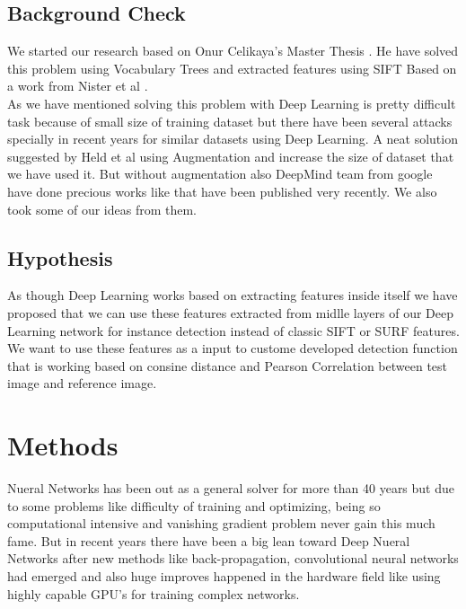 \documentclass[10pt,twocolumn,letterpaper]{article}
\begin{document}
\subsection{Background Check}
We started our research based on Onur Celikaya's Master Thesis \cite{Onur_Calikus_YLT}. He have solved this problem using Vocabulary Trees and extracted features using SIFT \cite{SIFT} Based on a work from Nister et al \cite{vocabulary_tree}. \\
As we have mentioned solving this problem with Deep Learning is pretty difficult task because of small size of training dataset but there have been several attacks specially in recent years for similar datasets using Deep Learning. A neat solution suggested by Held et al \cite{augmented_deep} using Augmentation and increase the size of dataset that we have used it. But without augmentation also DeepMind team from google have done precious works like \cite{oneshotlearning1}\cite{oneshotlearning2}\cite{oneshotlearning3} that have been published very recently. We also took some of our ideas from them.


\subsection{Hypothesis}
As though Deep Learning works based on extracting features inside itself we have proposed that we can use these features extracted from midlle layers of our Deep Learning network for instance detection instead of classic SIFT or SURF features. We want to use these features as a input to custome developed detection function that is working based on consine distance and Pearson Correlation between test image and reference image.


\section{Methods}
Nueral Networks has been out as a general solver for more than 40 years but due to some problems like difficulty of training and optimizing, being so computational intensive and vanishing gradient problem never gain this much fame. But in recent years there have been a big lean toward Deep Nueral Networks after new methods like back-propagation, convolutional neural networks had emerged and also huge improves happened in the hardware field like using highly capable GPU's for training complex networks. 
\end{document}
